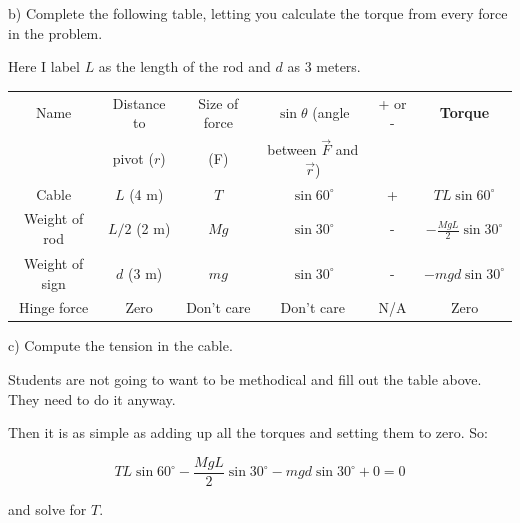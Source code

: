 \documentclass[12pt]{article}
\begin{document}
\newpage


b) Complete the following table, letting you calculate the torque from every force in the problem. 

{\color{red} Here I label $L$ as the length of the rod and $d$ as 3 meters.}

\large
\begin{center}
\begin{tabular}{|c|c|c|c|c|c|}
\hline
Name & Distance to & Size of force & $\sin \theta$ (angle  & + or - & {\bf Torque} \\
     & pivot ($r$) & (F) & between $\vec F$ and $\vec r$) & & \\\hline
   
     {\color{red} Cable}              &    {\color{red}$L$ (4 m)}                       &  {\color{red}$T$}                       &  {\color{red}$\sin 60^\circ$}                                             &     {\color{red}+}                &      {\color{red}$TL \sin 60^\circ$   }                       \\ \hline
      {\color{red} Weight of rod}         & {\color{red}$L/2$ (2 m)}                        &  {\color{red}$Mg$}                      &     {\color{red}$\sin 30^\circ$}                                         & {\color{red}-}                   &  {\color{red}$-\frac{MgL}{2} \sin 30^\circ$}                             \\ \hline
      {\color{red}Weight of sign}        &       {\color{red}$d$ (3 m)}                  & {\color{red}$mg$}                       &    {\color{red}$\sin 30^\circ$}                                          &   {\color{red}-}                 & {\color{red}$-mgd \sin 30^\circ$}                              \\ \hline
     {\color{red}Hinge force}         &    {\color{red}Zero}                     &     {\color{red}Don't care}                   &     {\color{red}Don't care}                                         &    {\color{red}N/A}                &    {\color{red}Zero}                           \\ \hline
\end{tabular}
\end{center}
\normalsize
c) Compute the tension in the cable.

{\color{red} Students are not going to want to be methodical and fill out the table above. They need to do it anyway.
	
	Then it is as simple as adding up all the torques and setting them to zero. So:
	
	$$TL \sin 60^\circ - \frac{MgL}{2} \sin 30^\circ -mgd \sin 30^\circ + 0 = 0$$
	
	and solve for $T$.
}
\end{document}
